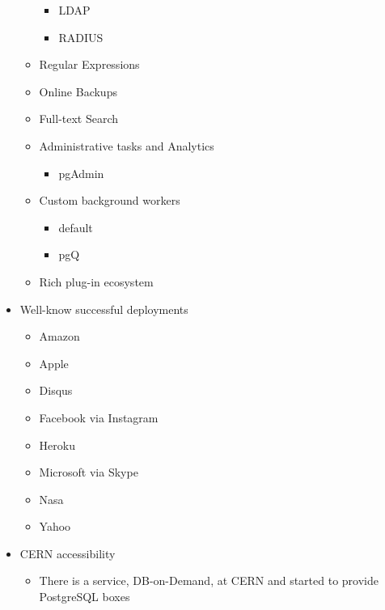 \begin{itemize}
\begin{itemize}
\begin{itemize}
	  \item LDAP
	  \item RADIUS
	\end{itemize}
	\item Regular Expressions
	\item Online Backups
	\item Full-text Search
	\item Administrative tasks and Analytics
	\begin{itemize}
	  \item pgAdmin
	\end{itemize}
    \item Custom background workers
	\begin{itemize}
	  \item default
	  \item pgQ
	\end{itemize}
	\item Rich plug-in ecosystem
  \end{itemize}
  \item Well-know successful deployments
  \begin{itemize}
    \item Amazon
    \item Apple
    \item Disqus
    \item Facebook via Instagram
    \item Heroku
    \item Microsoft via Skype
    \item Nasa
    \item Yahoo
  \end{itemize}
  \item CERN accessibility
  \begin{itemize}
    \item There is a service, DB-on-Demand, at CERN and started to provide PostgreSQL boxes
  \end{itemize}
\end{itemize}
